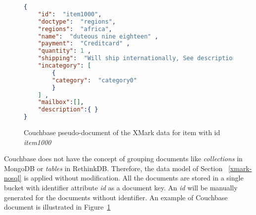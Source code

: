 \begin{figure}[h]
\begin{lstlisting}[language=JSON,  basicstyle =\scriptsize]
{
	"id":  "item1000",
	"doctype":  "regions",
	"regions":  "africa",
	"name":  "duteous nine eighteen" ,
	"payment":  "Creditcard" ,
	"quantity": 1 ,
	"shipping":  "Will ship internationally, See description for charges" ,
	"incategory": [
		{
		"category":  "category0"
		}
	] ,
	"mailbox":[],
	"description":{ }
}
\end{lstlisting} 
\caption{Couchbase pseudo-document of the XMark data for item with id \textit{item1000}}
\label{code:couchbase-item0}
\end{figure}

Couchbase does not have the concept of grouping documents like \textit{collections} in MongoDB  or \textit{tables} in RethinkDB. 
Therefore, the data model of Section ~\ref{xmark-nosql} is applied without modification.
 All the documents are stored in a single bucket with identifier attribute \textit{id} as a document key. An \textit{id} will be manually generated for the documents without identifier.
 An example of Couchbase document is illustrated in Figure~\ref{code:couchbase-item0}
